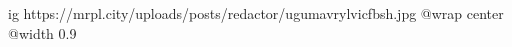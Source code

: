 
 
 
 
 

\ifcmt
  ig https://mrpl.city/uploads/posts/redactor/ugumavrylvicfbsh.jpg
  @wrap center
  @width 0.9
\fi
